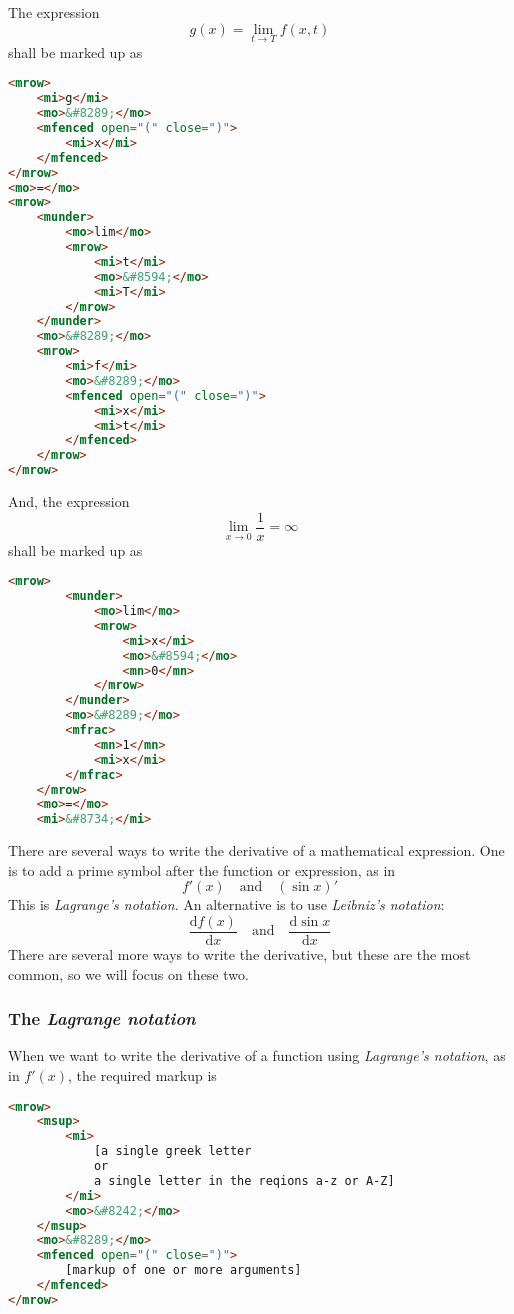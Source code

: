 \documentclass[english,a4paper,11pt]{article}
\begin{document}
\begin{examples}
	
	The expression 
\begin{equation}
g(x) =\lim_{t \rightarrow T} f(x,t)
\end{equation}
shall be marked up as
\begin{lstlisting}[language=HTML]
<mrow>
	<mi>g</mi>
	<mo>&#8289;</mo>
	<mfenced open="(" close=")">
		<mi>x</mi>
	</mfenced>
</mrow>
<mo>=</mo>
<mrow>
	<munder>
		<mo>lim</mo>
		<mrow>
			<mi>t</mi>
			<mo>&#8594;</mo>
			<mi>T</mi>
		</mrow>
	</munder>
	<mo>&#8289;</mo>
	<mrow>
		<mi>f</mi>
		<mo>&#8289;</mo>
		<mfenced open="(" close=")">
			<mi>x</mi>
			<mi>t</mi>
		</mfenced>
	</mrow>
</mrow>
\end{lstlisting}

	And, the expression 
	\begin{equation}
	\lim_{x \rightarrow 0} \frac{1}{x} = \infty
	\end{equation}
	shall be marked up as
	\begin{lstlisting}[language=HTML]
	<mrow>
		<munder>
			<mo>lim</mo>
			<mrow>
				<mi>x</mi>
				<mo>&#8594;</mo>
				<mn>0</mn>
			</mrow>
		</munder>
		<mo>&#8289;</mo>
		<mfrac>
			<mn>1</mn>
			<mi>x</mi>
		</mfrac>
	</mrow>
	<mo>=</mo>
	<mi>&#8734;</mi>
	\end{lstlisting}
\end{examples}

\bigskip
There are several ways to write the derivative of a mathematical expression. One is to add a prime symbol after the function or expression, as in 
\begin{equation}
f'(x)\quad\text{and}\quad (\sin x)'
\end{equation}
This is \emph{Lagrange's notation}. An alternative is to use \emph{Leibniz's notation}:
\begin{equation}
\frac{\text{d}f(x)}{\text{d}x}\quad\text{and}\quad \frac{\text{d}\sin x}{\text{d}x}
\end{equation}
There are several more ways to write the derivative, but these are the most common, so we will focus on these two.

\subsubsection{The \emph{Lagrange notation}}
When we want to write the derivative of a function using \emph{Lagrange's notation}, as in $f'(x)$, the required markup is

\begin{lstlisting}[language=HTML]
<mrow>
	<msup>
		<mi>
			[a single greek letter 
			or 
			a single letter in the reqions a-z or A-Z]
		</mi>
		<mo>&#8242;</mo>
	</msup>
	<mo>&#8289;</mo>
	<mfenced open="(" close=")">
		[markup of one or more arguments]
	</mfenced>
</mrow>
\end{lstlisting}
\end{document}
